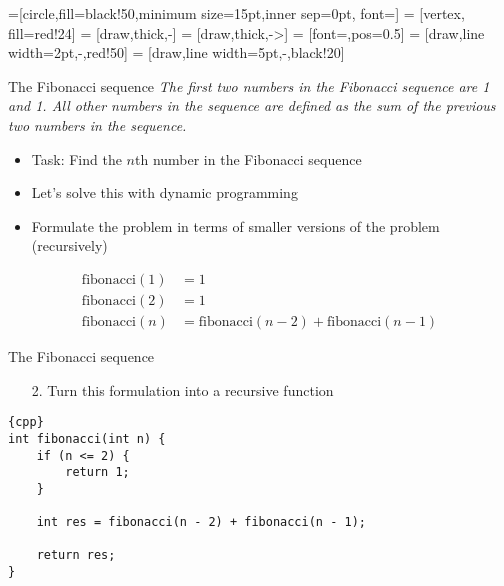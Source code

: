 =[circle,fill=black!50,minimum size=15pt,inner sep=0pt, font=\small]
 = [vertex, fill=red!24]
 = [draw,thick,-]
 = [draw,thick,->]
 = [font=\scriptsize,pos=0.5]
 = [draw,line width=2pt,-,red!50]
 = [draw,line width=5pt,-,black!20]

\begin{frame}[fragile]{The Fibonacci sequence}
    \textit{The first two numbers in the Fibonacci sequence are 1 and 1. All
            other numbers in the sequence are defined as the sum of the previous two
            numbers in the sequence.}

    \begin{itemize}
        \item Task: Find the $n$th number in the Fibonacci sequence
        \item Let's solve this with dynamic programming
    \end{itemize}

    \begin{itemize}
        \item Formulate the problem in terms of smaller versions of the problem (recursively)
    \end{itemize}

    \begin{align*}
        \mathrm{fibonacci}(1) &= 1\\
        \mathrm{fibonacci}(2) &= 1\\
        \mathrm{fibonacci}(n) &= \mathrm{fibonacci}(n - 2) + \mathrm{fibonacci}(n - 1)
    \end{align*}
\end{frame}

\begin{frame}[fragile]{The Fibonacci sequence}
    \begin{itemize}
        \item[2.] Turn this formulation into a recursive function
    \end{itemize}

    \begin{lstlisting}[basicstyle=\footnotesize]{cpp}
int fibonacci(int n) {
    if (n <= 2) {
        return 1;
    }

    int res = fibonacci(n - 2) + fibonacci(n - 1);

    return res;
}
    \end{lstlisting}
\end{frame}

